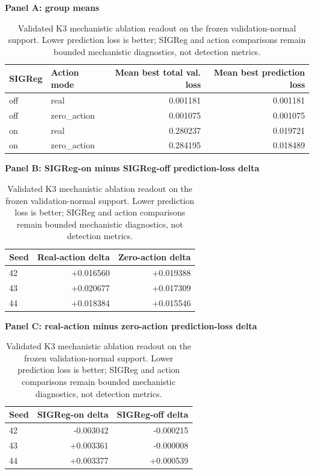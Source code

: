 \begin{table}[t]
\centering
\caption{Validated K3 mechanistic ablation readout on the frozen validation-normal support. Lower
prediction loss is better; SIGReg and action comparisons remain bounded mechanistic diagnostics,
not detection metrics.}
\label{tab:k3-ablation-results}
\small
\textbf{Panel A: group means}
\begin{tabular}{llrr}
\toprule
SIGReg & Action mode & Mean best total val. loss & Mean best prediction loss \\
\midrule
off & real & 0.001181 & 0.001181 \\
off & zero\_action & 0.001075 & 0.001075 \\
on & real & 0.280237 & 0.019721 \\
on & zero\_action & 0.284195 & 0.018489 \\
\bottomrule
\end{tabular}

\medskip
\textbf{Panel B: SIGReg-on minus SIGReg-off prediction-loss delta}
\begin{tabular}{lrr}
\toprule
Seed & Real-action delta & Zero-action delta \\
\midrule
42 & +0.016560 & +0.019388 \\
43 & +0.020677 & +0.017309 \\
44 & +0.018384 & +0.015546 \\
\bottomrule
\end{tabular}

\medskip
\textbf{Panel C: real-action minus zero-action prediction-loss delta}
\begin{tabular}{lrr}
\toprule
Seed & SIGReg-on delta & SIGReg-off delta \\
\midrule
42 & -0.003042 & -0.000215 \\
43 & +0.003361 & -0.000008 \\
44 & +0.003377 & +0.000539 \\
\bottomrule
\end{tabular}
\end{table}
